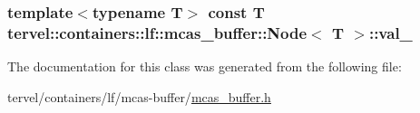 \subsubsection[{val\+\_\+}]{\setlength{\rightskip}{0pt plus 5cm}template$<$typename T$>$ const T {\bf tervel\+::containers\+::lf\+::mcas\+\_\+buffer\+::\+Node}$<$ T $>$\+::val\+\_\+\hspace{0.3cm}{\ttfamily [private]}}\label{classtervel_1_1containers_1_1lf_1_1mcas__buffer_1_1_node_a4e4a3009f3c6bdde1a0d55513bcfc89f}


The documentation for this class was generated from the following file\+:\begin{DoxyCompactItemize}
\item 
tervel/containers/lf/mcas-\/buffer/\hyperlink{mcas__buffer_8h}{mcas\+\_\+buffer.\+h}\end{DoxyCompactItemize}
